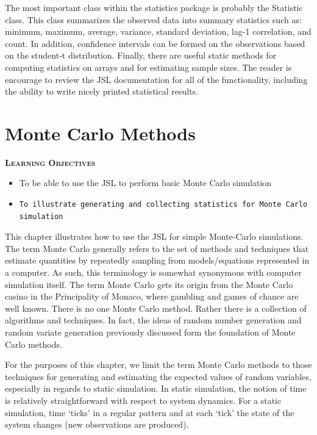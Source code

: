 \documentclass[
]{book}
\theoremstyle{definition}
\theoremstyle{definition}
\theoremstyle{definition}
\theoremstyle{definition}
\theoremstyle{remark}
\begin{document}
The most important class within the statistics package is probably the
Statistic class. This class summarizes the observed data into summary
statistics such as: minimum, maximum, average, variance, standard
deviation, lag-1 correlation, and count. In addition, confidence
intervals can be formed on the observations based on the student-t
distribution. Finally, there are useful static methods for computing
statistics on arrays and for estimating sample sizes. The reader is
encourage to review the JSL documentation for all of the functionality,
including the ability to write nicely printed statistical results.

\hypertarget{mcm}{%
\chapter{Monte Carlo Methods}\label{mcm}}

\textbf{\textsc{Learning Objectives}}

\begin{itemize}
\item
  To be able to use the JSL to perform basic Monte Carlo simulation
\item
\begin{verbatim}
To illustrate generating and collecting statistics for Monte Carlo simulation
\end{verbatim}
\end{itemize}

This chapter illustrates how to use the JSL for simple Monte-Carlo
simulations. The term Monte Carlo generally refers to the set of methods
and techniques that estimate quantities by repeatedly sampling from
models/equations represented in a computer. As such, this terminology is
somewhat synonymous with computer simulation itself. The term Monte
Carlo gets its origin from the Monte Carlo casino in the Principality of
Monaco, where gambling and games of chance are well known. There is no
one Monte Carlo method. Rather there is a collection of algorithms and
techniques. In fact, the ideas of random number generation and random
variate generation previously discussed form the foundation of Monte
Carlo methods.

For the purposes of this chapter, we limit the term Monte Carlo methods
to those techniques for generating and estimating the expected values of
random variables, especially in regards to static simulation. In static
simulation, the notion of time is relatively straightforward with
respect to system dynamics. For a static simulation, time `ticks' in a
regular pattern and at each `tick' the state of the system changes (new
observations are produced).
\end{document}

